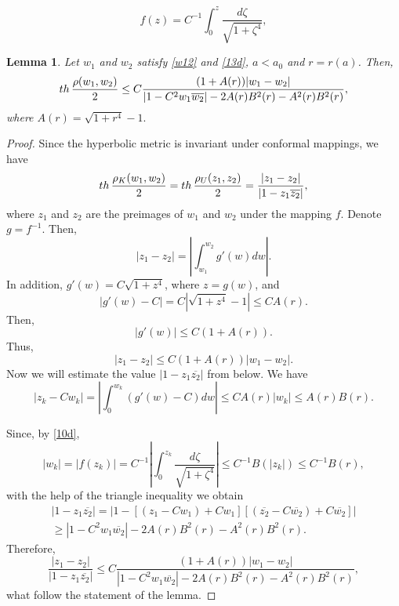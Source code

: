 \documentclass[10pt,a4paper]{amsart}
\newtheorem{lemma}{Lemma}
\def\th{\mathop{\rm th}\nolimits}
\begin{document}
\begin{equation}\label{10d}
f(z)=C^{-1}\int_0^z \frac{d\zeta}{\sqrt{1+\zeta^4}},
\end{equation}

\begin{lemma} \label{t8}
Let
$w_1$ and $w_2$ satisfy \eqref{w12} and \eqref{13d}, $a<a_0$ and $r=r(a)$. Then,
$$
\th\frac{\rho(w_1,w_2)}{2}
\le C\frac{(1+A(r))|w_1-w_2|}{ |1-C^2w_1\overline{w_2}|-2A(r)B^2(r)-A^2(r)B^2(r)},
$$
where
$
A(r)=\sqrt{1+r^4}-1.
$

\end{lemma}

\begin{proof}
Since the hyperbolic metric is invariant under conformal mappings, we have
$$
\th\frac{\rho_K(w_1,w_2)}{2}=\th\frac{\rho_U(z_1,z_2)}{2}=\frac{|z_1-z_2|}{|1-z_1\overline{z_2}|},
$$
where  $z_1$ and $z_2$ are the preimages of $w_1$ and $w_2$ under the mapping $f$. Denote $g=f^{-1}$. Then,
$$
|z_1-z_2|=\left|\int_{w_1}^{w_2}g'(w)dw\right|.
$$
In addition, $g'(w)=C \sqrt{1+z^4}$, where $z=g(w)$, and
$$
|g'(w)-C|=C |\sqrt{1+z^4}-1|
\le CA(r).
$$
Then,
$$
|g'(w)|\le C (1+A(r)).
$$
Thus,
$$
|z_1-z_2|\le C (1+A(r))|w_1-w_2|.
$$
Now we will estimate  the value $|1-z_1\overline{z_2}|$ from below.
We have
$$
|z_k-Cw_k|=\left| \int_0^{w_k}(g'(w)-C)dw\right|\le C A(r)|w_k|\le A(r)B(r).
$$

Since, by \eqref{10d},
$$
|w_k|=|f(z_k)|=C^{-1}\left|\int_0^{z_k}\frac{d\zeta}{\sqrt{1+\zeta^4}}\right|\le C^{-1}B(|z_k|)\le C^{-1}B(r),
$$
with the help of the triangle inequality we obtain
\begin{multline*}
|1-z_1\overline{z_2}|=|1-[(z_1-Cw_1)+Cw_1][(\overline{z_2}-C\overline{w_2})+C\overline{w_2}]|
\\
\ge |1-C^2w_1\overline{w_2}|-2A(r)B^2(r)-A^2(r)B^2(r).
\end{multline*}
Therefore,
$$
\frac{|z_1-z_2|}{|1-z_1\overline{z_2}|}\le C\frac{(1+A(r))|w_1-w_2|}{ |1-C^2w_1\overline{w_2}|-2A(r)B^2(r)-A^2(r)B^2(r)},
$$
what follow the statement of the lemma.
\end{proof}
\end{document}

